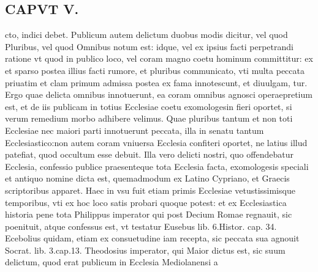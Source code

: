 \documentclass{article}
\begin{document}
\begin{pages}
\section*{CAPVT  V. }
\marginpar{[ p.52 ]}\pstart cto, indici debet. Publicum autem delictum duobus modis dicitur, vel quod Pluribus, vel quod Omnibus notum est: idque, vel ex ipsius facti perpetrandi ratione vt quod in publico loco, vel coram magno coetu hominum committitur: ex et sparso postea illius facti rumore, et pluribus communicato, vti multa peccata priuatim et clam primum admissa postea ex fama innotescunt, et diuulgam, tur. Ergo quae delicta omnibus innotuerunt, ea coram omnibus agnosci operaepretium est, et de iis publicam in totius Ecclesiae coetu exomologesin fieri oportet, si verum remedium morbo adhibere velimus. Quae pluribus tantum et non toti Ecclesiae nec maiori parti innotuerunt peccata, illa in senatu tantum Ecclesiastico:non autem coram vniuersa Ecclesia confiteri oportet, ne latius illud patefiat, quod occultum esse debuit. Illa vero delicti nostri, quo offendebatur Ecclesia, confessio publice praesenteque tota Ecclesia facta, exomologesis speciali et antiquo nomine dicta est, quemadmodum ex Latino Cypriano, et Graecis scriptoribus apparet. Haec in vsu fuit etiam primis Ecclesiae vetustissimisque temporibus, vti ex hoc loco satis probari quoque potest: et ex Ecclesiastica historia pene tota Philippus imperator qui post Decium Romae regnauit, sic poenituit, atque confessus est, vt testatur Eusebus  lib. 6.Histor. cap. 34. Ecebolius quidam, etiam ex consuetudine iam recepta, sic peccata sua agnouit Socrat. lib. 3.cap.13. Theodosius imperator, qui Maior dictus est, sic suum delictum, quod erat publicum in Ecclesia Mediolanensi a\pend

\end{pages}
\end{document}
